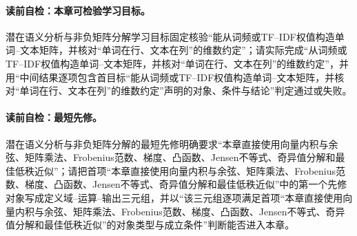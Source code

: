 \label{struct:V4-C05-CH01}
\paragraph{读前自检：本章可检验学习目标。}潜在语义分析与非负矩阵分解学习目标固定核验“能从词频或TF--IDF权值构造单词--文本矩阵，并核对“单词在行、文本在列”的维数约定”；请实际完成“从词频或TF--IDF权值构造单词--文本矩阵，并核对“单词在行、文本在列”的维数约定”，并用“中间结果逐项包含首目标“能从词频或TF--IDF权值构造单词--文本矩阵，并核对“单词在行、文本在列”的维数约定”声明的对象、条件与结论”判定通过或失败。\par


\label{struct:V4-C05-CH02}
\paragraph{读前自检：最短先修。}潜在语义分析与非负矩阵分解的最短先修明确要求“本章直接使用向量内积与余弦、矩阵乘法、Frobenius范数、梯度、凸函数、Jensen不等式、奇异值分解和最佳低秩近似”；请把首项“本章直接使用向量内积与余弦、矩阵乘法、Frobenius范数、梯度、凸函数、Jensen不等式、奇异值分解和最佳低秩近似”中的第一个先修对象写成定义域--运算--输出三元组，并以“该三元组逐项满足首项“本章直接使用向量内积与余弦、矩阵乘法、Frobenius范数、梯度、凸函数、Jensen不等式、奇异值分解和最佳低秩近似”的对象类型与成立条件”判断能否进入本章。\par

